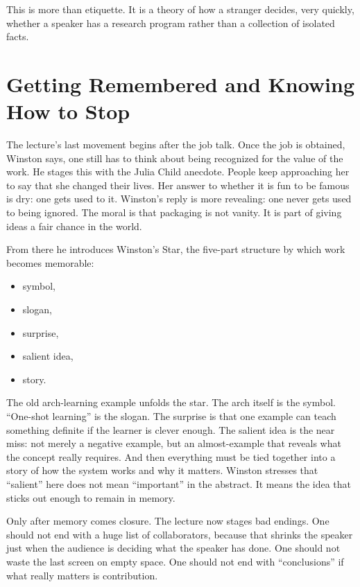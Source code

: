 This is more than etiquette. It is a theory of how a stranger decides, very quickly, whether a speaker has a research program rather than a collection of isolated facts.

\section{Getting Remembered and Knowing How to Stop}

The lecture's last movement begins after the job talk. Once the job is obtained, Winston says, one still has to think about being recognized for the value of the work. He stages this with the Julia Child anecdote. People keep approaching her to say that she changed their lives. Her answer to whether it is fun to be famous is dry: one gets used to it. Winston's reply is more revealing: one never gets used to being ignored. The moral is that packaging is not vanity. It is part of giving ideas a fair chance in the world.

From there he introduces Winston's Star, the five-part structure by which work becomes memorable:

\begin{itemize}
\item symbol,
\item slogan,
\item surprise,
\item salient idea,
\item story.
\end{itemize}

The old arch-learning example unfolds the star. The arch itself is the symbol. ``One-shot learning'' is the slogan. The surprise is that one example can teach something definite if the learner is clever enough. The salient idea is the near miss: not merely a negative example, but an almost-example that reveals what the concept really requires. And then everything must be tied together into a story of how the system works and why it matters. Winston stresses that ``salient'' here does not mean ``important'' in the abstract. It means the idea that sticks out enough to remain in memory.

Only after memory comes closure. The lecture now stages bad endings. One should not end with a huge list of collaborators, because that shrinks the speaker just when the audience is deciding what the speaker has done. One should not waste the last screen on empty space. One should not end with ``conclusions'' if what really matters is contribution.

